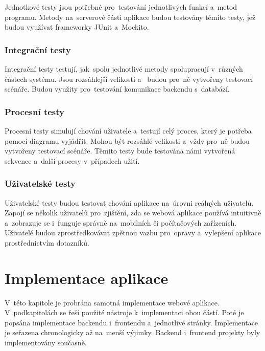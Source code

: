 \documentclass[twoside]{ctuthesis}
\begin{document}
Jednotkové testy jsou potřebné pro~testování jednotlivých funkcí a~metod programu. Metody na~serverové části aplikace budou testovány těmito testy, jež budou využívat frameworky JUnit a~Mockito.

\subsection{Integrační testy}

Integrační testy testují, jak~spolu jednotlivé metody spolupracují v~různých částech systému. Jsou rozsáhlejší velikosti a~ budou pro~ně vytvořeny testovací scénáře. Budou využity pro~testování komunikace backendu s~databází.

\subsection{Procesní testy}

Procesní testy simulují chování uživatele a~testují celý proces, který je potřeba pomocí diagramu vyjádřit. Mohou být rozsáhlé velikosti a~vždy pro~ně budou vytvořeny testovací scénáře. Těmito testy bude testována námi vytvořená sekvence a~další procesy v~případech užití.

\subsection{Uživatelské testy}

Uživatelské testy budou testovat chování aplikace na~úrovni reálných uživatelů. Zapojí se několik uživatelů pro~zjištění, zda se webová aplikace používá intuitivně a~zobrazuje se i~funguje správně na~mobilních či počítačových zařízeních. Uživatelé budou zprostředkovávat zpětnou vazbu pro~opravy a~vylepšení aplikace prostřednictvím dotazníků.

%
%
\chapter{Implementace aplikace}

V~této kapitole je probrána samotná implementace webové aplikace. V~podkapitolách se řeší použité nástroje k~implementaci obou částí. Poté je popsána implementace backendu i~frontendu a~jednotlivé stránky. Implementace je seřazena chronologicky až na~menší výjimky. Backend i~frontend projekty byly implementovány současně.
\end{document}
